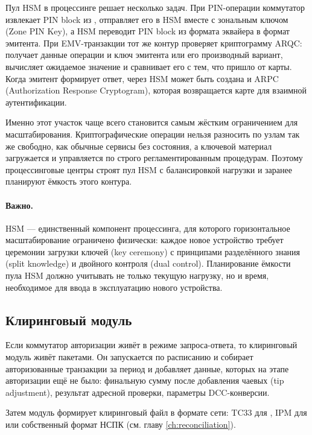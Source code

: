 Пул HSM в процессинге решает несколько задач. При PIN-операции
коммутатор извлекает PIN block из , отправляет его
в HSM вместе с зональным ключом (Zone PIN Key), а HSM
переводит PIN block из формата эквайера в формат эмитента.
При EMV-транзакции тот же контур проверяет криптограмму ARQC:
получает данные операции и ключ эмитента или его производный
вариант, вычисляет ожидаемое значение и сравнивает его
с тем, что пришло от карты. Когда эмитент формирует ответ,
через HSM может быть создана и ARPC
(Authorization Response Cryptogram), которая возвращается
карте для взаимной аутентификации.~\cite{iso-9564,ansi-x9-24,emvco-book2,emvco-book3}

Именно этот участок чаще всего становится самым жёстким
ограничением для масштабирования. Криптографические операции
нельзя разносить по узлам так же свободно, как обычные сервисы
без состояния, а ключевой материал загружается и управляется
по строго регламентированным процедурам. Поэтому процессинговые
центры строят пул HSM с балансировкой нагрузки и заранее
планируют ёмкость этого контура.~\cite{pci-pin-security,pci-pts-hsm,ansi-x9-24}

\paragraph{Важно.}
  HSM — единственный компонент процессинга, для которого
  горизонтальное масштабирование ограничено физически: каждое
  новое устройство требует церемонии загрузки ключей
  (key ceremony) с принципами разделённого знания
  (split knowledge) и двойного контроля (dual control).
  Планирование
  ёмкости пула HSM должно учитывать не только текущую нагрузку,
  но и время, необходимое для ввода в эксплуатацию нового
  устройства.~\cite{pci-pin-security,ansi-x9-24}


\subsection*{Клиринговый модуль}

Если коммутатор авторизации живёт в режиме запроса-ответа,
то клиринговый модуль живёт пакетами. Он запускается
по расписанию и собирает
авторизованные транзакции за период и добавляет данные,
которых на этапе авторизации ещё не было: финальную сумму
после добавления чаевых (tip adjustment), результат адресной
проверки, параметры DCC-конверсии.

Затем модуль формирует клиринговый файл в формате сети:
TC33 для , IPM для 
или собственный формат НСПК (см. главу \ref{ch:reconciliation}).~\cite{visa-russia-operating-regs,mc-tpr,nspk-mir-rules}

